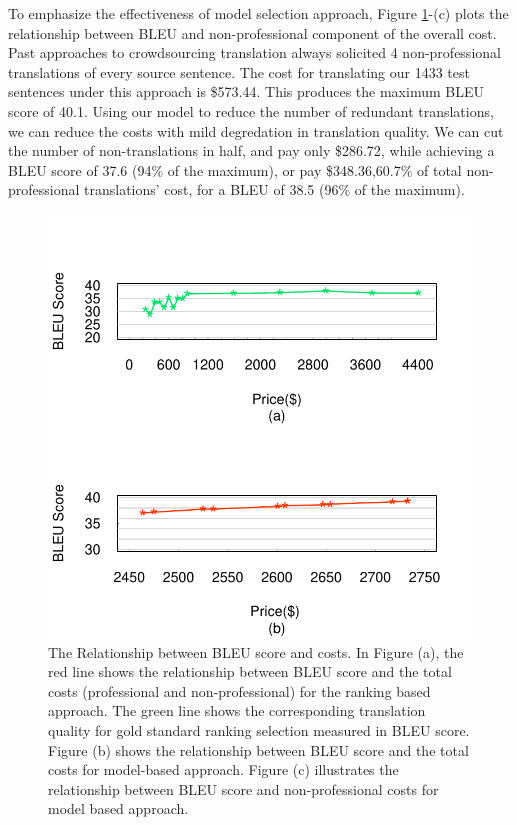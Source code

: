 \documentclass[11pt]{article}
\begin{document}
To emphasize the effectiveness of model selection approach, Figure \ref{fbleucost}-(c) plots the relationship between BLEU and non-professional component of the overall cost.  Past approaches to crowdsourcing translation always solicited 4 non-professional translations of every source sentence. The cost for translating our 1433 test sentences under this approach is \$573.44.  This produces the maximum BLEU score of 40.1.  Using our model to reduce the number of redundant translations, we can reduce the costs with mild degredation in translation quality.  We can cut the number of non-translations in half, and pay only \$286.72, while achieving a BLEU score of 37.6 (94\% of the maximum), or pay \$348.36,60.7\% of total non-professional translations' cost, for a BLEU of 38.5 (96\% of  the maximum).

\begin{figure}[htbp]
  \centering
  \includegraphics[width=\linewidth]{cost-bleu/pricecost.pdf}
  \caption{The Relationship between BLEU score and costs. In Figure (a), the red line shows the relationship between BLEU score and  the total costs (professional and non-professional) for the ranking based approach. The green line shows the corresponding translation quality for gold standard ranking selection measured in BLEU score. Figure (b) shows the relationship between BLEU score and the total costs for model-based approach. Figure (c)  illustrates the relationship between BLEU score and non-professional costs for model based approach.}
    \label{fbleucost}
\end{figure}
\end{document}
